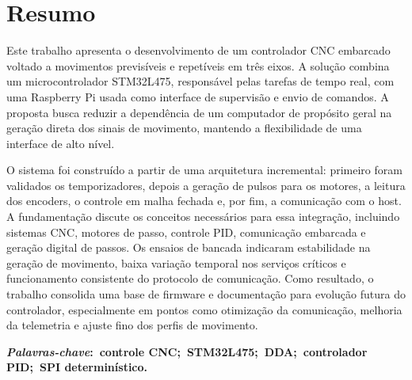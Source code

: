 \chapter*{Resumo}
\noindent Este trabalho apresenta o desenvolvimento de um controlador CNC
embarcado voltado a movimentos previsíveis e repetíveis em três eixos.
A solução combina um microcontrolador STM32L475, responsável pelas tarefas
de tempo real, com uma Raspberry Pi usada como interface de supervisão e
envio de comandos. A proposta busca reduzir a dependência de um computador
de propósito geral na geração direta dos sinais de movimento, mantendo a
flexibilidade de uma interface de alto nível.

O sistema foi construído a partir de uma arquitetura incremental: primeiro
foram validados os temporizadores, depois a geração de pulsos para os
motores, a leitura dos encoders, o controle em malha fechada e, por fim, a
comunicação com o host. A fundamentação discute os conceitos necessários
para essa integração, incluindo sistemas CNC, motores de passo, controle
PID, comunicação embarcada e geração digital de passos. Os ensaios de
bancada indicaram estabilidade na geração de movimento, baixa variação
temporal nos serviços críticos e funcionamento consistente do protocolo de
comunicação. Como resultado, o trabalho consolida uma base de firmware e
documentação para evolução futura do controlador, especialmente em pontos
como otimização da comunicação, melhoria da telemetria e ajuste fino dos
perfis de movimento.

\vspace{5mm}

\noindent\textbf{\textit{Palavras-chave}:~controle CNC;~STM32L475;~DDA;~controlador PID;~SPI determinístico.}
